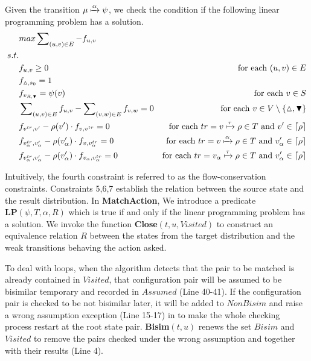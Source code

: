 \documentclass[a4paper,runningheads]{llncs}
\begin{document}
Given the transition $\mu\xmapsto{\alpha}\psi$, we check the condition if the following linear programming problem has a solution.
\begin{equation*}
    \begin{aligned}
    & max\sum\nolimits_{(u,v)\in E}-f_{u,v} &\\
    s.t. & &\\
    & f_{u,v}\ge0 & \text{for each }(u,v)\in E\\
    & f_{\vartriangle,s_0}=1 &\\
    & f_{v_{R,\blacktriangledown}}=\psi(v) & \text{for each }v\in S\\
    & \sum\nolimits_{(u,v)\in E}f_{u,v}-\sum\nolimits_{(v,w)\in E}f_{v,w}=0 & \text{for each }v\in V\setminus\{\vartriangle,\blacktriangledown\}\\
    & f_{v^{tr},v'}-\rho(v')\cdot f_{v,v^{tr}}=0 & \text{for each }tr=v\xmapsto{\tau}\rho\in T\text{ and }v'\in\lceil\rho\rceil\\
    & f_{v_{\alpha}^{tr},v'_{\alpha}}-\rho(v'_{\alpha})\cdot f_{v,v_{\alpha}^{tr}}=0 & \text{for each }tr=v\xmapsto{\alpha}\rho\in T\text{ and }v'_{\alpha}\in\lceil\rho\rceil\\
    & f_{v_{\alpha}^{tr},v'_{\alpha}}-\rho(v'_{\alpha})\cdot f_{v_{\alpha},v_{\alpha}^{tr}}=0 & \text{for each }tr=v_{\alpha}\xmapsto{\tau}\rho\in T\text{ and }v'_{\alpha}\in\lceil\rho\rceil\\
    \end{aligned}
\end{equation*}

Intuitively, the fourth constraint is referred to as the flow-conservation constraints. Constraints 5,6,7 establish the relation between the source state and the result distribution. In \textbf{MatchAction}, We introduce a predicate $\textbf{LP}(\psi,T,\alpha,R)$ which is true if and only if the linear programming problem has a solution. We invoke the function \textbf{Close}$(t,u,Visited)$ to construct an equivalence relation $R$ between the states from the target distribution and the weak transitions behaving the action asked.

To deal with loops, when the algorithm detects that the pair to be matched is already contained in $Visited$, that configuration pair will be assumed to be bisimilar temporary and recorded in $Assumed$ (Line 40-41). If the configuration pair is checked to be not bisimilar later, it will be added to $NonBisim$ and raise a wrong assumption exception (Line 15-17) in to make the whole checking process restart at the root state pair. \textbf{Bisim}$(t, u)$ renews the set $Bisim$ and $Visited$ to remove the pairs checked under the wrong assumption and together with their results (Line 4). 
\end{document}
